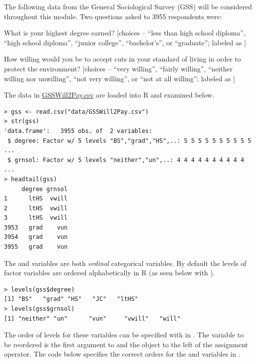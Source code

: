 \documentclass[10pt,openany]{book}\usepackage[]{graphicx}\usepackage[]{color}
\makeatletter
\newenvironment{kframe}{%
 \def\at@end@of@kframe{}%
 \ifinner\ifhmode%
  \def\at@end@of@kframe{\end{minipage}}%
  \begin{minipage}{\columnwidth}%
 \fi\fi%
 \def\FrameCommand##1{\hskip\@totalleftmargin \hskip-\fboxsep
 \colorbox{shadecolor}{##1}\hskip-\fboxsep
     \hskip-\linewidth \hskip-\@totalleftmargin \hskip\columnwidth}%
 \MakeFramed {\advance\hsize-\width
   \@totalleftmargin\z@ \linewidth\hsize
   \@setminipage}}%
 {\par\unskip\endMakeFramed%
 \at@end@of@kframe}
\newenvironment{knitrout}{}{} %
\makeatother
\begin{document}
\newpage
The following data from the General Sociological Survey (GSS) will be considered throughout this module.  Two questions asked to 3955 respondents were:
\vspace{-12pt}
\begin{Itemize}
  \item What is your highest degree earned? [choices -- ``less than high school diploma'', ``high school diploma'', ``junior college'', ``bachelor's'', or ``graduate''; labeled as ]
  \item How willing would you be to accept cuts in your standard of living in order to protect the environment? [choices -- ``very willing'', ``fairly willing'', ``neither willing nor unwilling'', ``not very willing'', or ``not at all willing''; labeled as ]
\end{Itemize}
The data in \href{https://raw.githubusercontent.com/droglenc/NCData/master/GSSWill2Pay.csv}{GSSWill2Pay.csv} are loaded into R and examined below.
\begin{knitrout}
\color{fgcolor}\begin{kframe}
\begin{verbatim}
> gss <- read.csv("data/GSSWill2Pay.csv")
> str(gss)
'data.frame':	3955 obs. of  2 variables:
 $ degree: Factor w/ 5 levels "BS","grad","HS",..: 5 5 5 5 5 5 5 5 5 5 ...
 $ grnsol: Factor w/ 5 levels "neither","un",..: 4 4 4 4 4 4 4 4 4 4 ...
> headtail(gss)
     degree grnsol
1      ltHS  vwill
2      ltHS  vwill
3      ltHS  vwill
3953   grad    vun
3954   grad    vun
3955   grad    vun
\end{verbatim}
\end{kframe}
\end{knitrout}
The  and  variables are both \emph{ordinal} categorical variables.  By default the levels of factor variables are ordered alphabetically in R (as seen below with ).
\begin{knitrout}
\color{fgcolor}\begin{kframe}
\begin{verbatim}
> levels(gss$degree)
[1] "BS"   "grad" "HS"   "JC"   "ltHS"
> levels(gss$grnsol)
[1] "neither" "un"      "vun"     "vwill"   "will"   
\end{verbatim}
\end{kframe}
\end{knitrout}
The order of levels for these variables can be specified with  in . The variable to be reordered is the first argument to  and the object to the left of the assignment operator. The code below specifies the correct orders for the  and  variables in .
\end{document}
